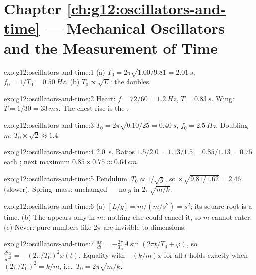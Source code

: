 \section*{Chapter \ref{ch:g12:oscillators-and-time} --- Mechanical Oscillators and the Measurement of Time}

\begin{solution}{exo:g12:oscillators-and-time:1}
(a) $T_0 = 2\pi\sqrt{1.00/9.81} = \qty{2.01}{s}$;
$f_0 = 1/T_0 = \qty{0.50}{Hz}$. (b) $T_0 \propto \sqrt{L}$: the
 doubles.
\end{solution}

\begin{solution}{exo:g12:oscillators-and-time:2}
Heart: $f = 72/60 = \qty{1.2}{Hz}$, $T = \qty{0.83}{s}$. Wing:
$T = 1/30 = \qty{33}{ms}$. The chest rise is the \emph{}.
\end{solution}

\begin{solution}{exo:g12:oscillators-and-time:3}
$T_0 = 2\pi\sqrt{0.10/25} = \qty{0.40}{s}$, $f_0 = \qty{2.5}{Hz}$.
Doubling $m$: $T_0 \times \sqrt{2} \approx 1.4$.
\end{solution}

\begin{solution}{exo:g12:oscillators-and-time:4}
 \qty{2.0}{s}. Ratios $1.5/2.0 = 1.13/1.5 = 0.85/1.13
= 0.75$ each ; next maximum $0.85 \times 0.75 \approx
\qty{0.64}{cm}$.
\end{solution}

\begin{solution}{exo:g12:oscillators-and-time:5}
Pendulum: $T_0 \propto 1/\sqrt{g}$, so $\times\sqrt{9.81/1.62} =
2.46$ (slower). Spring--mass: unchanged --- no $g$ in
$2\pi\sqrt{m/k}$.
\end{solution}

\begin{solution}{exo:g12:oscillators-and-time:6}
(a) $[L/g] = \unit{m}/(\unit{m/s^2}) = \unit{s^2}$; its square root
is a time. (b) The  appears only in $m$: nothing else could
cancel it, so $m$ cannot enter. (c) Never: pure numbers like $2\pi$
are invisible to dimensions.
\end{solution}

\begin{solution}{exo:g12:oscillators-and-time:7}
$\frac{dx}{dt} = -\frac{2\pi}{T_0}A\sin(2\pi t/T_0 + \varphi)$, so
$\frac{d^2x}{dt^2} = -(2\pi/T_0)^2 x(t)$. Equality with $-(k/m)x$
for all $t$ holds exactly when $(2\pi/T_0)^2 = k/m$, i.e.\
$T_0 = 2\pi\sqrt{m/k}$.
\end{solution}

